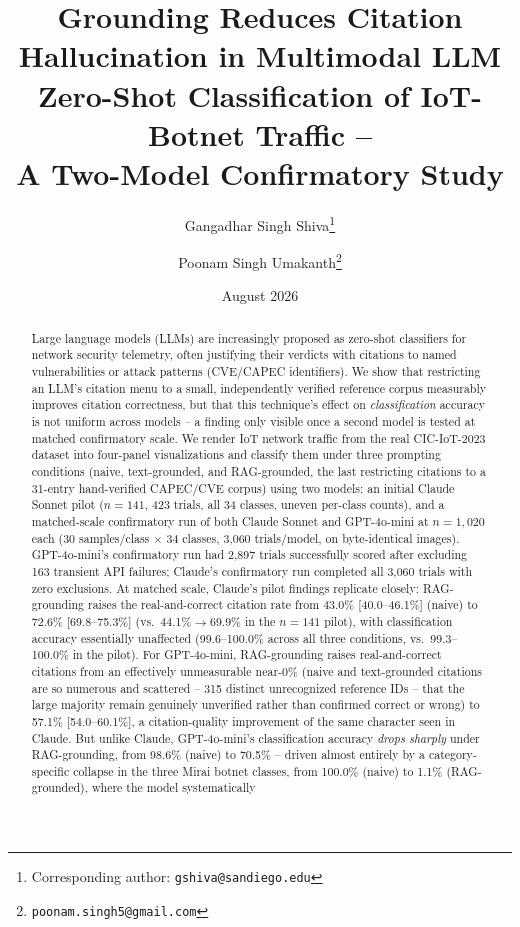 \documentclass[11pt]{article}
\title{Grounding Reduces Citation Hallucination in Multimodal LLM\\
Zero-Shot Classification of IoT-Botnet Traffic --\\
\large A Two-Model Confirmatory Study}
\author[1]{Gangadhar Singh Shiva\thanks{Corresponding author: \texttt{gshiva@sandiego.edu}}}
\author[2]{Poonam Singh Umakanth\thanks{\texttt{poonam.singh5@gmail.com}}}
\affil[1]{University of San Diego}
\affil[2]{HPE Juniper Networking, Hewlett Packard Enterprise}
\date{August 2026}
\begin{document}
\maketitle

\begin{abstract}
Large language models (LLMs) are increasingly proposed as zero-shot classifiers for network
security telemetry, often justifying their verdicts with citations to named vulnerabilities or
attack patterns (CVE/CAPEC identifiers). We show that restricting an LLM's citation menu to a
small, independently verified reference corpus measurably improves citation correctness, but
that this technique's effect on \emph{classification} accuracy is not uniform across models --
a finding only visible once a second model is tested at matched confirmatory scale. We render IoT network traffic
from the real CIC-IoT-2023 dataset into four-panel visualizations and classify
them under three prompting conditions (naive, text-grounded, and RAG-grounded, the last
restricting citations to a 31-entry hand-verified CAPEC/CVE corpus) using two models: an initial
Claude Sonnet pilot ($n=141$, 423 trials, all 34 classes, uneven per-class counts), and a
matched-scale confirmatory run of both Claude Sonnet and GPT-4o-mini at $n=1{,}020$ each
(30 samples/class $\times$ 34 classes, 3,060 trials/model, on byte-identical images). GPT-4o-mini's
confirmatory run had 2,897 trials successfully scored after excluding 163 transient API failures;
Claude's confirmatory run completed all 3,060 trials with zero exclusions. At matched scale,
Claude's pilot findings replicate closely: RAG-grounding raises the real-and-correct citation rate
from 43.0\% [40.0--46.1\%] (naive) to 72.6\% [69.8--75.3\%] (vs.\ 44.1\%$\to$69.9\% in the
$n=141$ pilot), with classification accuracy essentially unaffected (99.6--100.0\% across all
three conditions, vs.\ 99.3--100.0\% in the pilot). For GPT-4o-mini, RAG-grounding raises
real-and-correct citations from an effectively unmeasurable near-0\% (naive and text-grounded
citations are so numerous and scattered -- 315 distinct unrecognized reference IDs -- that the
large majority remain genuinely unverified rather than confirmed correct or wrong) to 57.1\%
[54.0--60.1\%], a citation-quality improvement of the same character seen in Claude. But unlike
Claude, GPT-4o-mini's classification accuracy \emph{drops sharply} under RAG-grounding, from
98.6\% (naive) to 70.5\% -- driven almost entirely by a category-specific collapse in the three
Mirai botnet classes, from 100.0\% (naive) to 1.1\% (RAG-grounded), where the model systematically

\end{abstract}
\end{document}
